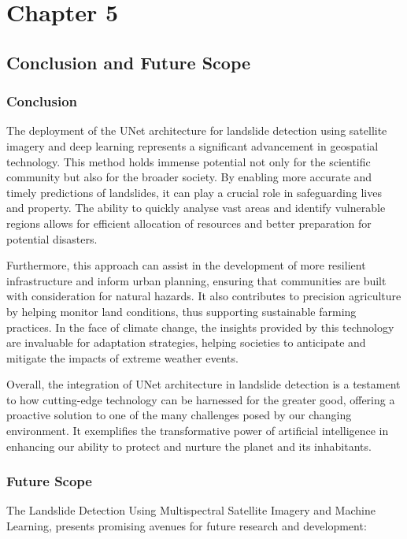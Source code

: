 \documentclass[12pt,a4paper]{report}
\newcommand{\mytitle}{Landslide Detection Using Multispectral Satellite Imagery and Machine Learning}
\begin{document}
\thispagestyle{empty}
 \newpage
			{\vfill \chapter*{\centering \vfill Chapter 5 \vfill}\vfill}
		\thispagestyle{empty}
	
	\newpage
	\label{Conclusion and Future Scope}
	\section{Conclusion and Future Scope}

	\subsection{Conclusion}	The deployment of the UNet architecture for landslide detection using satellite imagery and deep learning represents a significant advancement in geospatial technology. This method holds immense potential not only for the scientific community but also for the broader society. By enabling more accurate and timely predictions of landslides, it can play a crucial role in safeguarding lives and property. The ability to quickly analyse vast areas and identify vulnerable regions allows for efficient allocation of resources and better preparation for potential disasters.

Furthermore, this approach can assist in the development of more resilient infrastructure and inform urban planning, ensuring that communities are built with consideration for natural hazards. It also contributes to precision agriculture by helping monitor land conditions, thus supporting sustainable farming practices. In the face of climate change, the insights provided by this technology are invaluable for adaptation strategies, helping societies to anticipate and mitigate the impacts of extreme weather events.

Overall, the integration of UNet architecture in landslide detection is a testament to how cutting-edge technology can be harnessed for the greater good, offering a proactive solution to one of the many challenges posed by our changing environment. It exemplifies the transformative power of artificial intelligence in enhancing our ability to protect and nurture the planet and its inhabitants.	
	
	
	
	\subsection{Future Scope}	The \mytitle , presents promising avenues for future research and development: 
\end{document}
